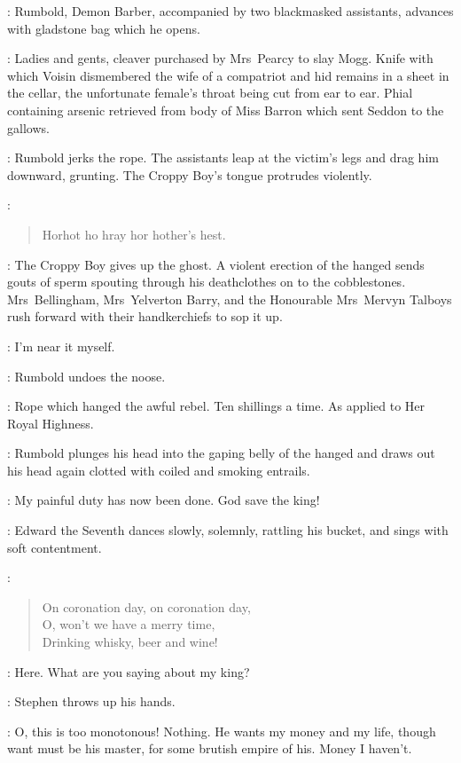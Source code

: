 :
Rumbold, Demon Barber, accompanied by two blackmasked assistants,
advances with gladstone bag which he opens.

\RumboldDemonBarber:
Ladies and gents, cleaver purchased by Mrs~Pearcy to slay Mogg.
Knife with which Voisin dismembered the wife of a compatriot
and hid remains in a sheet in the cellar,
the unfortunate female's throat being cut from ear to ear.
Phial containing arsenic retrieved from body of Miss Barron
which sent Seddon to the gallows.

:
Rumbold jerks the rope.
The assistants leap at the victim's legs and drag him downward, grunting.
The Croppy Boy's tongue protrudes violently.

\CroppyBoy:
\begin{verse}
    Horhot ho hray hor hother's hest.
\end{verse}

:
The Croppy Boy gives up the ghost.
A violent erection of the hanged sends gouts of sperm spouting
through his deathclothes on to the cobblestones.
Mrs~Bellingham, Mrs~Yelverton Barry,
and the Honourable Mrs~Mervyn Talboys
rush forward with their handkerchiefs to sop it up.

\Rumbold:
I'm near it myself.

:
Rumbold undoes the noose.

\Rumbold:
Rope which hanged the awful rebel.
Ten shillings a time.
As applied to Her Royal Highness.

:
Rumbold plunges his head into the gaping belly of the hanged
and draws out his head again clotted with coiled and smoking entrails.

\Rumbold:
My painful duty has now been done.
God save the king!

:
Edward the Seventh dances slowly, solemnly, rattling his bucket, and
sings with soft contentment.

\EdwardSeventh:
\begin{verse}
    On coronation day, on coronation day,\\
    O, won't we have a merry time,\\
    Drinking whisky, beer and wine!
\end{verse}

\Carr[2]:
Here. What are you saying about my king?

:
Stephen throws up his hands.

\Stephen:
O, this is too monotonous!
Nothing.
He wants my money and my life, though want must be his master,
for some brutish empire of his.
Money I haven't.

